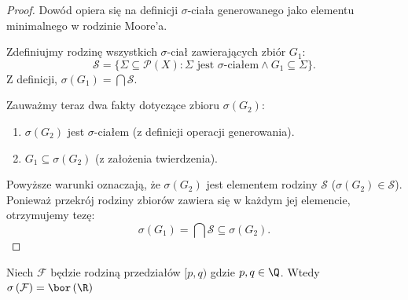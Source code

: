 \begin{proof}
    Dowód opiera się na definicji $\sigma$-ciała generowanego jako elementu minimalnego w rodzinie Moore'a.
    
    Zdefiniujmy rodzinę wszystkich $\sigma$-ciał zawierających zbiór $G_1$:
    \[
        \mathcal{S} = \{ \Sigma \subseteq \mathcal{P}(X) : \Sigma \text{ jest } \sigma\text{-ciałem} \land G_1 \subseteq \Sigma \}.
    \]
    Z definicji, $\sigma(G_1) = \bigcap \mathcal{S}$.
    
    Zauważmy teraz dwa fakty dotyczące zbioru $\sigma(G_2)$:
    \begin{enumerate}
        \item $\sigma(G_2)$ jest $\sigma$-ciałem (z definicji operacji generowania).
        \item $G_1 \subseteq \sigma(G_2)$ (z założenia twierdzenia).
    \end{enumerate}
    
    Powyższe warunki oznaczają, że $\sigma(G_2)$ jest elementem rodziny $\mathcal{S}$ ($\sigma(G_2) \in \mathcal{S}$).
    Ponieważ przekrój rodziny zbiorów zawiera się w każdym jej elemencie, otrzymujemy tezę:
    \[
        \sigma(G_1) = \bigcap \mathcal{S} \subseteq \sigma(G_2).
    \]
\end{proof}
\begin{lemma}
	Niech $\mathcal{F}$ będzie rodziną przedziałów $[p,q)$ gdzie $p,q\in \Q$. Wtedy $\sigma\left( \mathcal{F} \right) = \bor\left(\R\right) $
\end{lemma} 
